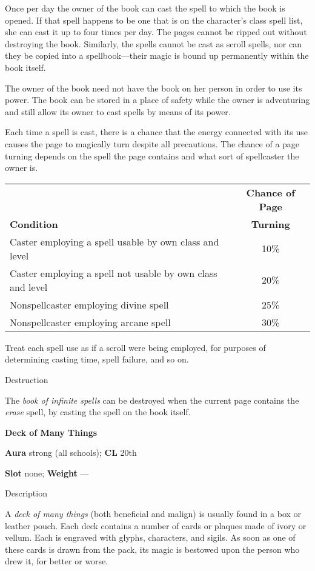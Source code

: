 Once per day the owner of the book can cast the spell to which the book is opened. If that spell happens to be one that is on the character's class spell list, she can cast it up to four times per day. The pages cannot be ripped out without destroying the book. Similarly, the spells cannot be cast as scroll spells, nor can they be copied into a spellbook---their magic is bound up permanently within the book itself.
				
The owner of the book need not have the book on her person in order to use its power. The book can be stored in a place of safety while the owner is adventuring and still allow its owner to cast spells by means of its power.
				
Each time a spell is cast, there is a chance that the energy connected with its use causes the page to magically turn despite all precautions. The chance of a page turning depends on the spell the page contains and what sort of spellcaster the owner is.

\begin{tabularx}{\linewidth}{Xc}
                   & \textbf{Chance of Page} \\
\textbf{Condition} & \textbf{Turning} \\
Caster employing a spell usable by own class and level & 10\% \\
Caster employing a spell not usable by own class and level & 20\% \\
Nonspellcaster employing divine spell & 25\% \\
Nonspellcaster employing arcane spell & 30\% \\
\end{tabularx}

				
Treat each spell use as if a scroll were being employed, for purposes of determining casting time, spell failure, and so on. 
				
Destruction
				
The \textit{book of infinite spells }can be destroyed when the current page contains the \textit{erase }spell, by casting the spell on the book itself.
				
\textbf{Deck of Many Things}
				
\textbf{Aura} strong (all schools); \textbf{CL} 20th
				
\textbf{Slot} none; \textbf{Weight }---
				
Description
				
A \textit{deck of many things }(both beneficial and malign) is usually found in a box or leather pouch. Each deck contains a number of cards or plaques made of ivory or vellum. Each is engraved with glyphs, characters, and sigils. As soon as one of these cards is drawn from the pack, its magic is bestowed upon the person who drew it, for better or worse.
				
